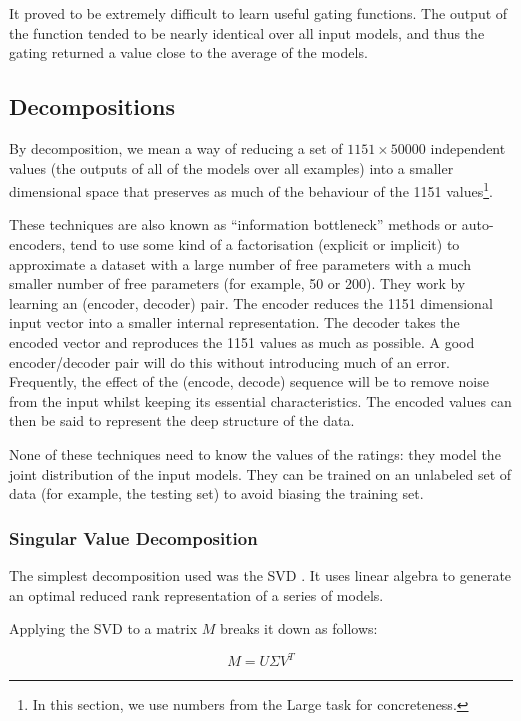 \documentclass{article}
\begin{document}
It proved to be extremely difficult to learn useful gating functions.  The output of the function tended to be nearly identical over all input models, and thus the gating returned a value close to the average of the models.

\subsection{Decompositions}

By decomposition, we mean a way of reducing a set of $1151\times50000$ independent values (the outputs of all of the models over all examples) into a smaller dimensional space that preserves as much of the behaviour of the 1151 values\footnote{In this section, we use numbers from the Large task for concreteness.}.

These techniques are also known as ``information bottleneck'' methods or auto-encoders, tend to use some kind of a factorisation (explicit or implicit) to approximate a dataset with a large number of free parameters with a much smaller number of free parameters (for example, 50 or 200).
They work by learning an (encoder, decoder) pair.  The encoder reduces the 1151 dimensional input vector into a smaller internal representation.  The decoder takes the encoded vector and reproduces the 1151 values as much as possible.  A good encoder/decoder pair will do this without introducing much of an error.  Frequently, the effect of the (encode, decode) sequence will be to remove noise from the input whilst keeping its essential characteristics.  The encoded values can then be said to represent the deep structure of the data.

None of these techniques need to know the values of the ratings: they model the joint distribution of the input models.
They can be trained on an unlabeled set of data (for example, the testing set) to avoid biasing the training set.

\subsubsection{Singular Value Decomposition}

The simplest decomposition used was the SVD \cite{deerwester90}.  It uses linear algebra to generate an optimal reduced rank representation of a series of models.

Applying the SVD to a matrix $M$ breaks it down as follows:

\begin{equation}
M = U \Sigma V^T
\end{equation}
\end{document}
